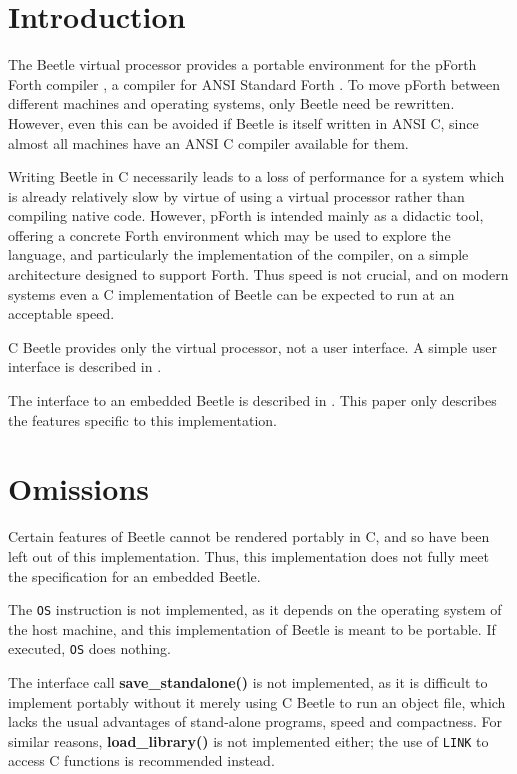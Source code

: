 %
%
%
%


\section{Introduction}

The Beetle virtual processor \cite{beetledis} provides a portable environment
for the pForth Forth compiler \cite{beetledis}, a compiler for ANSI Standard
Forth \cite{ANSIforth}. To move pForth between different machines and
operating systems, only Beetle need be rewritten. However, even this can be
avoided if Beetle is itself written in ANSI C, since almost all machines have
an ANSI C compiler available for them.

Writing Beetle in C necessarily leads to a loss of performance for a system
which is already relatively slow by virtue of using a virtual processor
rather than compiling native code. However, pForth is intended mainly as a
didactic tool, offering a concrete Forth environment which may be used to
explore the language, and particularly the implementation of the compiler, on
a simple architecture designed to support Forth. Thus speed is not crucial,
and on modern systems even a C implementation of Beetle can be expected to
run at an acceptable speed.

C Beetle provides only the virtual processor, not a user interface. A simple
user interface is described in \cite{beetledis}.

The interface to an embedded Beetle is described in \cite{beetledis}. This paper
only describes the features specific to this implementation.


\section{Omissions}
\label{omissions}

Certain features of Beetle cannot be rendered portably in C, and so have been
left out of this implementation. Thus, this implementation does not fully
meet the specification for an embedded Beetle.

The {\tt OS} instruction is not implemented, as it depends on the operating
system of the host machine, and this implementation of Beetle is meant to be
portable. If executed, {\tt OS} does nothing.

The interface call {\bf save\_standalone()} is not implemented, as it is
difficult to implement portably without it merely using C Beetle to run an
object file, which lacks the usual advantages of stand-alone programs, speed
and compactness. For similar reasons, {\bf load\_library()} is not
implemented either; the use of {\tt LINK} to access C functions is
recommended instead.

